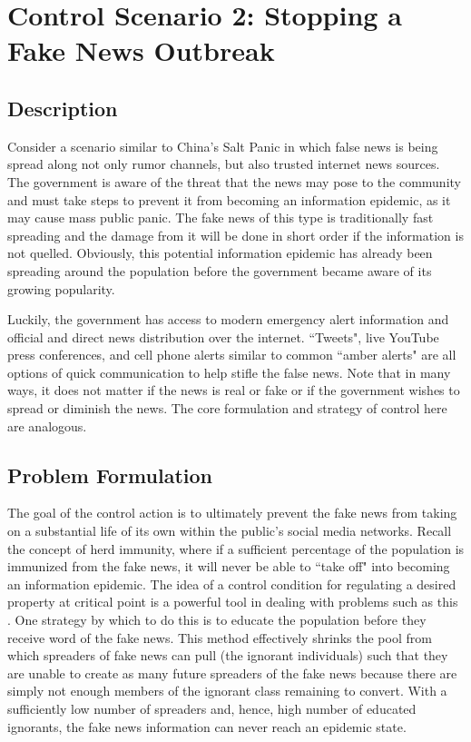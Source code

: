 \chapter{Control Scenario 2: Stopping a Fake News Outbreak} \label{chapter_control_fake}

\section{Description}
Consider a scenario similar to China's Salt Panic in which false news is being spread along not only rumor channels, but also trusted internet news sources. The government is aware of the threat that the news may pose to the community and must take steps to prevent it from becoming an information epidemic, as it may cause mass public panic. The fake news of this type is traditionally fast spreading and the damage from it will be done in short order if the information is not quelled. Obviously, this potential information epidemic has already been spreading around the population before the government became aware of its growing popularity.

Luckily, the government has access to modern emergency alert information and official and direct news distribution over the internet. ``Tweets", live YouTube press conferences, and cell phone alerts similar to common ``amber alerts" are all options of quick communication to help stifle the false news. Note that in many ways, it does not matter if the news is real or fake or if the government wishes to spread or diminish the news. The core formulation and strategy of control here are analogous.

\section{Problem Formulation}
The goal of the control action is to ultimately prevent the fake news from taking on a substantial life of its own within the public's social media networks. Recall the concept of herd immunity, where if a sufficient percentage of the population is immunized from the fake news, it will never be able to ``take off" into becoming an information epidemic. The idea of a control condition for regulating a desired property at critical point is a powerful tool in dealing with problems such as this \cite{agarwal2015feedback}. One strategy by which to do this is to educate the population before they receive word of the fake news. This method effectively shrinks the pool from which spreaders of fake news can pull (the ignorant individuals) such that they are unable to create as many future spreaders of the fake news because there are simply not enough members of the ignorant class remaining to convert. With a sufficiently low number of spreaders and, hence, high number of educated ignorants, the fake news information can never reach an epidemic state.

